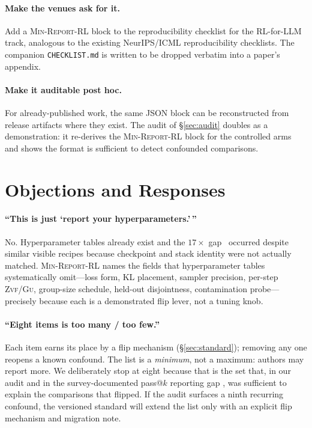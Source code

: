 \documentclass[11pt]{article}
\newcommand{\zvf}{\textsc{Zvf}}
\newcommand{\gu}{\textsc{Gu}}
\newcommand{\minreport}{\textsc{Min-Report-RL}}
\begin{document}
\paragraph{Make the venues ask for it.}
Add a \minreport{} block to the reproducibility checklist for the RL-for-LLM
track, analogous to the existing NeurIPS/ICML reproducibility checklists. The
companion \texttt{CHECKLIST.md} is written to be dropped verbatim into a paper's
appendix.

\paragraph{Make it auditable post hoc.}
For already-published work, the same JSON block can be reconstructed from
release artifacts where they exist. The audit of \S\ref{sec:audit} doubles as a
demonstration: it re-derives the \minreport{} block for the controlled arms and shows
the format is sufficient to detect confounded comparisons.

\section{Objections and Responses}
\label{sec:objections}

\paragraph{``This is just `report your hyperparameters.'\,''}
No. Hyperparameter tables already exist and the $17\times$ gap~\citep{zvfaudit2026} occurred
despite similar visible recipes because checkpoint and stack identity were not
actually matched. \minreport{} names the fields
that hyperparameter tables systematically omit---loss form, KL placement,
sampler precision, per-step \zvf{}/\gu{}, group-size schedule, held-out
disjointness, contamination probe---precisely because each is a demonstrated
flip lever, not a tuning knob.

\paragraph{``Eight items is too many / too few.''}
Each item earns its place by a flip mechanism (\S\ref{sec:standard}); removing
any one reopens a known confound. The list is a \emph{minimum}, not a maximum:
authors may report more. We deliberately stop at eight because that is the set
that, in our audit and in the survey-documented pass@$k$ reporting gap
\cite{agenticrlsurvey2026}, was sufficient to explain the comparisons that
flipped.
If the audit surfaces a ninth recurring confound, the versioned standard will
extend the list only with an explicit flip mechanism and migration note.
\end{document}
